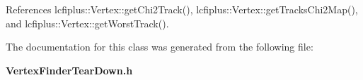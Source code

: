 References lcfiplus\+::\+Vertex\+::get\+Chi2\+Track(), lcfiplus\+::\+Vertex\+::get\+Tracks\+Chi2\+Map(), and lcfiplus\+::\+Vertex\+::get\+Worst\+Track().



The documentation for this class was generated from the following file\+:\begin{DoxyCompactItemize}
\item 
\textbf{ Vertex\+Finder\+Tear\+Down.\+h}\end{DoxyCompactItemize}
